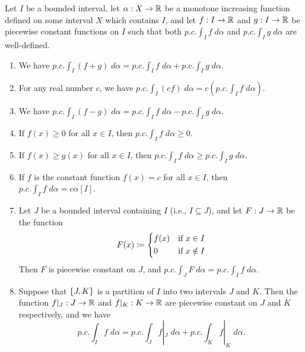 \begin{ac}\label{i:ac:11.8.7}
  Let \(I\) be a bounded interval, let \(\alpha : X \to \mathbb{R}\) be a monotone increasing function defined on some interval \(X\) which contains \(I\), and let \(f : I \to \mathbb{R}\) and \(g : I \to \mathbb{R}\) be piecewise constant functions on \(I\) such that both \(p.c. \int_I f \; d \alpha\) and \(p.c. \int_I g \; d \alpha\) are well-defined.
  \begin{enumerate}
    \item We have \(p.c. \int_I (f + g) \; d \alpha = p.c. \int_I f \; d \alpha + p.c. \int_I g \; d \alpha\).
    \item For any real number \(c\), we have \(p.c. \int_I (cf) \; d \alpha = c (p.c. \int_I f \; d \alpha)\).
    \item We have \(p.c. \int_I (f - g) \; d \alpha = p.c. \int_I f \; d \alpha - p.c. \int_I g \; d \alpha\).
    \item If \(f(x) \geq 0\) for all \(x \in I\), then \(p.c. \int_I f \; d \alpha \geq 0\).
    \item If \(f(x) \geq g(x)\) for all \(x \in I\), then \(p.c. \int_I f \; d \alpha \geq p.c. \int_I g \; d \alpha\).
    \item If \(f\) is the constant function \(f(x) = c\) for all \(x \in I\), then \(p.c. \int_I f \; d \alpha = c \alpha[I]\).
    \item Let \(J\) be a bounded interval containing \(I\) (i.e., \(I \subseteq J\)), and let \(F : J \to \mathbb{R}\) be the function
          \[
            F(x) \coloneqq \begin{dcases}
              f(x) & \text{if } x \in I    \\
              0    & \text{if } x \notin I
            \end{dcases}
          \]
          Then \(F\) is piecewise constant on \(J\), and \(p.c. \int_J F \; d \alpha = p.c. \int_I f \; d \alpha\).
    \item Suppose that \(\left\lbrace J, K\right\rbrace\) is a partition of \(I\) into two intervals \(J\) and \(K\).
          Then the function \(f|_J : J \to \mathbb{R}\) and \(f|_K : K \to \mathbb{R}\) are piecewise constant on \(J\) and \(K\) respectively, and we have
          \[
            p.c. \int_I f \; d \alpha = p.c. \int_J f|_J \; d \alpha + p.c. \int_K f|_K \; d \alpha.
          \]
  \end{enumerate}
\end{ac}

